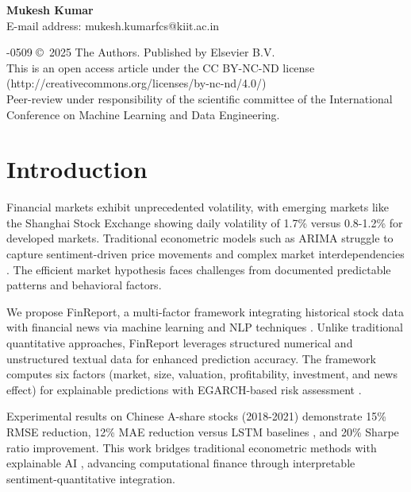 \documentclass[3p,times,procedia]{elsarticle}
\begin{document}
\vspace{12pt}
\noindent\textbf{Mukesh Kumar}\\
E-mail address: mukesh.kumarfcs@kiit.ac.in

\vspace{6pt}
-0509 \copyright\ 2025 The Authors. Published by Elsevier B.V.\\
This is an open access article under the CC BY-NC-ND license (http://creativecommons.org/licenses/by-nc-nd/4.0/)\\
Peer-review under responsibility of the scientific committee of the International Conference on Machine Learning and Data Engineering.

\vspace{12pt}

\section{Introduction}
\label{main}

Financial markets exhibit unprecedented volatility, with emerging markets like the Shanghai Stock Exchange showing daily volatility of 1.7\% versus 0.8-1.2\% for developed markets. Traditional econometric models such as ARIMA \cite{Box1970} struggle to capture sentiment-driven price movements and complex market interdependencies \cite{FAMA1993}. The efficient market hypothesis faces challenges from documented predictable patterns and behavioral factors.

We propose FinReport, a multi-factor framework integrating historical stock data with financial news via machine learning and NLP techniques \cite{Bao2017}. Unlike traditional quantitative approaches, FinReport leverages structured numerical and unstructured textual data for enhanced prediction accuracy. The framework computes six factors (market, size, valuation, profitability, investment, and news effect) for explainable predictions with EGARCH-based risk assessment \cite{Nelson1991}.

Experimental results on Chinese A-share stocks (2018-2021) \cite{FinReportDataset2025} demonstrate 15\% RMSE reduction, 12\% MAE reduction versus LSTM baselines \cite{Fischer2018}, and 20\% Sharpe ratio improvement. This work bridges traditional econometric methods with explainable AI \cite{TETLOCK2007,Ribeiro2016}, advancing computational finance through interpretable sentiment-quantitative integration.
\end{document}
